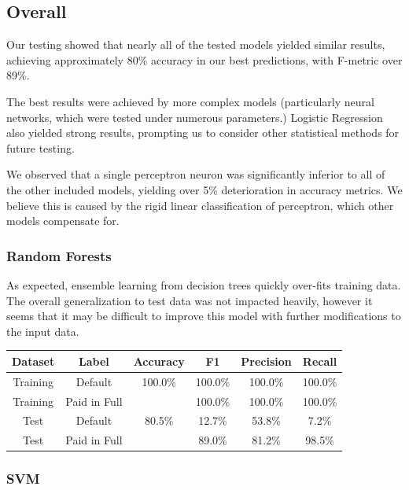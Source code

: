 \subsection{Overall}

Our testing showed that nearly all of the tested models yielded similar results, achieving approximately 80\% accuracy in our best predictions, with F-metric over 89\%.

The best results were achieved by more complex models (particularly neural networks, which were tested under numerous parameters.) Logistic Regression also yielded strong results, prompting us to consider other statistical methods for future testing.

We observed that a single perceptron neuron was significantly inferior to all of the other included models, yielding over 5\% deterioration in accuracy metrics. We believe this is caused by the rigid linear classification of perceptron, which other models compensate for.

\subsubsection{Random Forests}

As expected, ensemble learning from decision trees quickly over-fits training data. The overall generalization to test data was not impacted heavily, however it seems that it may be difficult to improve this model with further modifications to the input data.

        \begin{center}
        \begin{tabular}{| c | c || c | c | c | c |}
        \hline
        Dataset & Label & Accuracy & F1 & Precision & Recall \\
        \hline \hline
         Training & Default         & 100.0\% & 100.0\% & 100.0\% & 100.0\% \\
         Training & Paid in Full    &       & 100.0\% & 100.0\% & 100.0\% \\
         \hline
         Test & Default             & 80.5\% & 12.7\% & 53.8\% & 7.2\% \\
         Test & Paid in Full        &       & 89.0\% & 81.2\% & 98.5\% \\
         \hline
        \end{tabular}
        \end{center}

\subsubsection{SVM}


